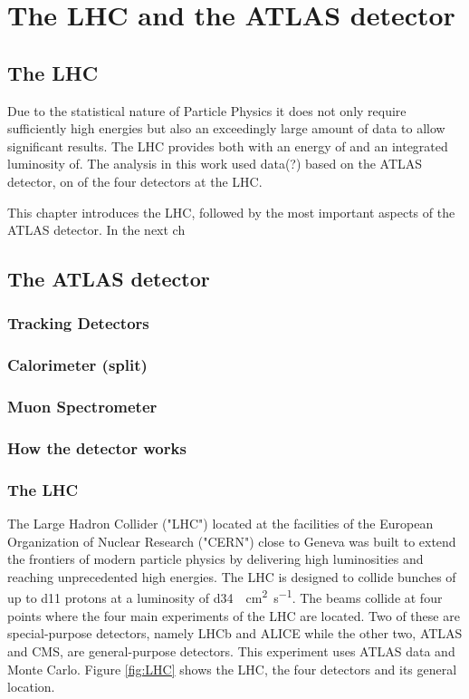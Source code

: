 \chapter{The LHC and the ATLAS detector}
\section{The LHC}

Due to the statistical nature of Particle Physics it does not only require sufficiently high energies but also an exceedingly large amount of data to allow significant results.
The LHC provides both with an energy of and an integrated luminosity of.
The analysis in this work used data(?) based on the ATLAS detector, on of the four detectors at the LHC.

This chapter introduces the LHC, followed by the most important aspects of the ATLAS detector. In the next ch

\section{The ATLAS detector}

\subsection{Tracking Detectors}

\subsection{Calorimeter (split)}

\subsection{Muon Spectrometer}

\subsection{How the detector works}

\subsection{The LHC}

The Large Hadron Collider ("LHC") located at the facilities of the European Organization of Nuclear Research ("CERN") close to Geneva was built to extend the frontiers of modern particle physics by delivering high luminosities and reaching unprecedented high energies.
The LHC is designed to collide bunches of up to \num{d11} protons at a luminosity of \SI{d34}{\per\square\cm \per\s}. The beams collide at four points where the four main experiments of the LHC are located. Two of these are special-purpose detectors, namely LHCb and ALICE while the other two, ATLAS and CMS, are general-purpose detectors.
This experiment uses ATLAS data and Monte Carlo.
Figure \ref{fig:LHC} shows the LHC, the four detectors and its general location.

